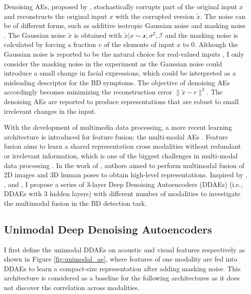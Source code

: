 Denoising AEs, proposed by \cite{vincent2008}, stochastically corrupts part of the original input $x$ and reconstructs the original input $x$ with the corrupted version $\tilde{x}$. The noise can be of different forms, such as additive isotropic Gaussian noise and masking noise \cite{vincent2010}. The Gaussian noise $\tilde{x}$ is obtained with $\tilde{x}|x \sim \mathcal{x, \sigma^2,I}$ and the masking noise is calculated by forcing a fraction $v$ of the elements of input $x$ to 0. Although the Gaussian noise is reported to be the natural choice for real-valued inputs \cite{vincent2010}, I only consider the masking noise in the experiment as the Gaussian noise could introduce a small change in facial expressions, which could be interpreted as a misleading descriptor for the BD symptoms. The objective of denoising AEs accordingly becomes minimizing the reconstruction error $\parallel \tilde{x}-r \parallel ^ 2$. The denoising AEs are reported to produce representations that are robust to small irrelevant changes in the input.

With the development of multimedia data processing, a more recent learning architecture is introduced for feature fusion: the multi-modal AEs \cite{mangai2010}. Feature fusion aims to learn a shared representation cross modalities without redundant or irrelevant information, which is one of the biggest challenges in multi-modal data processing \cite{mangai2010}. In the work of \cite{hong2015}, authors aimed to perform multimodal fusion of 2D images and 3D human poses to obtain high-level representations. 
Inspired by \cite{vincent2008}, \cite{mangai2010}, and \cite{dibekliouglu2017}, I propose a series of 3-layer Deep Denoising Autoencoders (DDAEs) (i.e., DDAEs with 3 hidden layers) with different number of modalities to investigate the multimodal fusion in the BD detection task. 

\subsection{Unimodal Deep Denoising Autoencoders}

I first define the unimodal DDAEs on acoustic and visual features respectively as shown in Figure \ref{fig:unimodal_ae}, where features of one modality are fed into DDAEs to learn a compact-size representation after adding masking noise. This architecture is considered as a baseline for the following architectures as it does not discover the correlation across modalities. 

